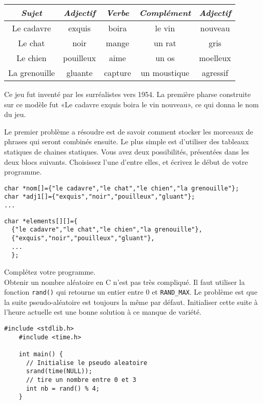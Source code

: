 \documentclass[10pt]{article}\usepackage[correction]{esial}
\begin{document}
\medskip\noindent\begin{minipage}{.6\linewidth}
  \begin{tabular}{|c|c|c|c|c|}\hline
    \textit{Sujet}&\textit{Adjectif}&\textit{Verbe}&\textit{Complément}&\textit{Adjectif}
    \\\hline
    Le cadavre&exquis&boira&le vin&nouveau\\\hline
    Le chat&noir&mange&un rat&gris\\\hline
    Le chien&pouilleux&aime&un os&moelleux\\\hline
    La grenouille&gluante&capture&un moustique&agressif\\\hline  
  \end{tabular}
\end{minipage}\hfill\begin{minipage}{.35\linewidth}
  Ce jeu fut inventé par les surréalistes vers 1954. La première
  pharse construite sur ce modèle fut «Le cadavre exquis boira le vin nouveau»,
  ce qui donna le nom du jeu.
\end{minipage}

\Question Le premier problème a résoudre est de savoir comment stocker les
morceaux de phrases qui seront combinés ensuite. Le plus simple est d'utiliser
des tableaux statiques de chaines statiques. Vous avez deux possibilités,
présentées dans les deux blocs suivants. Choisissez l'une d'entre elles, et
écrivez le début de votre programme. 


\begin{Verbatim}[label=Première approche pour le stockage des données]
char *nom[]={"le cadavre","le chat","le chien","la grenouille"};
char *adj1[]={"exquis","noir","pouilleux","gluant"};
...  
\end{Verbatim}

\begin{Verbatim}[label=Deuxieme approche pour le stockage des données]
char *elements[][]={
  {"le cadavre","le chat","le chien","la grenouille"},
  {"exquis","noir","pouilleux","gluant"},
  ...
  };
\end{Verbatim}

\noindent\begin{minipage}{.52\linewidth}
  \Question Complétez votre programme.\\
  Obtenir un nombre aléatoire en C n'est pas très compliqué. Il faut utiliser
  la fonction \texttt{rand()} qui retourne un entier entre 0 et
  \texttt{RAND\_MAX}. Le problème est que la suite pseudo-aléatoire est
  toujours la même par défaut. Initialiser cette suite à l'heure actuelle est
  une bonne solution à ce manque de variété.

\end{minipage}\hfill
\begin{minipage}{.45\linewidth}
  \begin{Verbatim}[gobble=4,numbers=right]
    #include <stdlib.h>
    #include <time.h>

    int main() {
      // Initialise le pseudo aleatoire
      srand(time(NULL));
      // tire un nombre entre 0 et 3
      int nb = rand() % 4;
    }
  \end{Verbatim}
\end{minipage}
\end{document}
